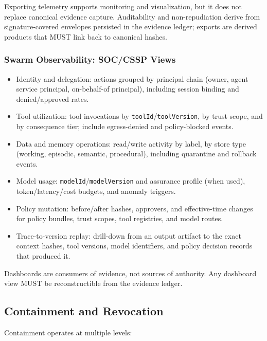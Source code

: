 \documentclass[11pt]{article}
\begin{document}
Exporting telemetry supports monitoring and visualization, but it does
not replace canonical evidence capture. Auditability and non-repudiation
derive from signature-covered envelopes persisted in the evidence
ledger; exports are derived products that MUST link back to canonical
hashes.

\hypertarget{swarm-observability-soccssp-views}{%
\subsubsection{Swarm Observability: SOC/CSSP Views}\label{swarm-observability-soccssp-views}}

\begin{itemize}
\tightlist
\item
  Identity and delegation: actions grouped by principal chain (owner,
  agent service principal, on-behalf-of principal), including session
  binding and denied/approved rates.
\item
  Tool utilization: tool invocations by
  \texttt{toolId}/\texttt{toolVersion}, by trust scope, and by
  consequence tier; include egress-denied and policy-blocked events.
\item
  Data and memory operations: read/write activity by label, by store
  type (working, episodic, semantic, procedural), including quarantine
  and rollback events.
\item
  Model usage: \texttt{modelId}/\texttt{modelVersion} and assurance
  profile (when used), token/latency/cost budgets, and anomaly triggers.
\item
  Policy mutation: before/after hashes, approvers, and effective-time
  changes for policy bundles, trust scopes, tool registries, and model
  routes.
\item
  Trace-to-version replay: drill-down from an output artifact to the
  exact context hashes, tool versions, model identifiers, and policy
  decision records that produced it.
\end{itemize}

Dashboards are consumers of evidence, not sources of authority. Any
dashboard view MUST be reconstructible from the evidence ledger.

\hypertarget{containment-and-revocation}{%
\subsection{Containment and Revocation}\label{containment-and-revocation}}

Containment operates at multiple levels:
\end{document}
